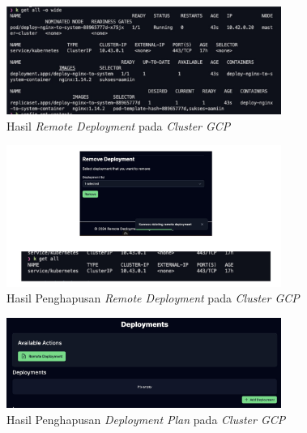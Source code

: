 \begin{figure}[ht]
  \centering
  \includegraphics[width=0.8\textwidth]{resources/chapter-4/pengujian/pengujian-sistem-gcp-06.jpg}
  \caption{Hasil \textit{Remote Deployment} pada \textit{Cluster GCP}}
  \label{fig:pengujian-sistem-gcp-06}
\end{figure}

\begin{figure}[ht]
  \centering
  \includegraphics[width=0.8\textwidth]{resources/chapter-4/pengujian/pengujian-sistem-gcp-07.jpg}
  \caption{Hasil Penghapusan \textit{Remote Deployment} pada \textit{Cluster GCP}}
  \label{fig:pengujian-sistem-gcp-07}
\end{figure}

\begin{figure}[ht]
  \centering
  \includegraphics[width=0.8\textwidth]{resources/chapter-4/pengujian/pengujian-sistem-gcp-08.jpg}
  \caption{Hasil Penghapusan \textit{Deployment Plan} pada \textit{Cluster GCP}}
  \label{fig:pengujian-sistem-gcp-08}
\end{figure}

